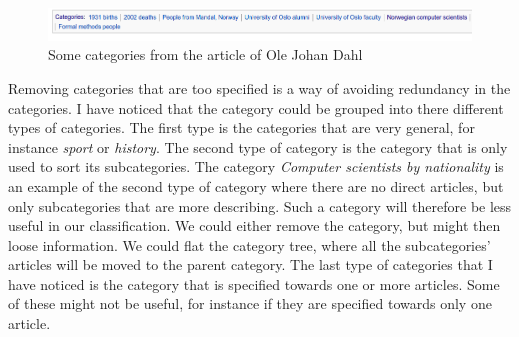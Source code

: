 \documentclass[11pt,english,a4paper]{article}
\begin{document}
\begin{figure}
\centering
\includegraphics[width=\textwidth]{Dumps/imgs/olejohandahl-categories.png}
\caption{Some categories from the article of Ole Johan Dahl}
\label{fig: olejohandahl_categories}
\end{figure}



Removing categories that are too specified is a way of avoiding redundancy in the categories. I have noticed that the category could be grouped into there different types of categories. The first type is the categories that are very general, for instance \textit{sport} or \textit{history}. The second type of category is the category that is only used to sort its subcategories. The category \textit{Computer scientists by nationality} is an example of the second type of  category where there are no direct articles, but only subcategories that are more describing. Such a category will therefore be less useful in our classification. We could either remove the category, but might then loose information. We could flat the category tree, where all the subcategories' articles will be moved to the parent category. The last type of categories that I have noticed is the category that is specified towards one or more articles. Some of these might not be useful, for instance if they are specified towards only one article. 


\end{document}
